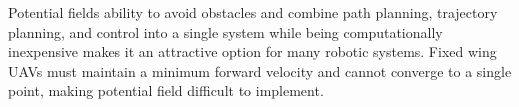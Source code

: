 \documentclass[numbered,pdftex]{ohio-etd}
\begin{document}
Potential fields ability to avoid obstacles and combine path planning, trajectory planning, and control into a single system while being computationally inexpensive makes it an attractive option for many robotic systems. Fixed wing UAVs must maintain a minimum forward velocity and cannot converge to a single point, making potential field difficult to implement.  




%
%
%
%
%
\end{document}

